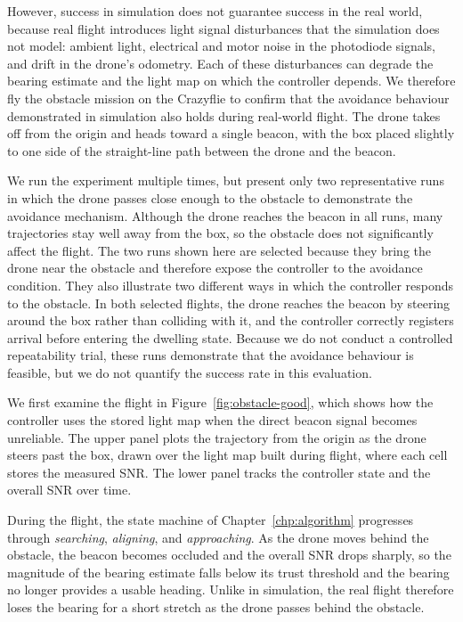 However, success in simulation does not guarantee success in the real world, because real flight introduces light signal disturbances that the simulation does not model: ambient light, electrical and motor noise in the photodiode signals, and drift in the drone's odometry. Each of these disturbances can degrade the bearing estimate and the light map on which the controller depends. We therefore fly the obstacle mission on the Crazyflie to confirm that the avoidance behaviour demonstrated in simulation also holds during real-world flight. The drone takes off from the origin and heads toward a single beacon, with the box placed slightly to one side of the straight-line path between the drone and the beacon.

We run the experiment multiple times, but present only two representative runs in which the drone passes close enough to the obstacle to demonstrate the avoidance mechanism. Although the drone reaches the beacon in all runs, many trajectories stay well away from the box, so the obstacle does not significantly affect the flight. The two runs shown here are selected because they bring the drone near the obstacle and therefore expose the controller to the avoidance condition. They also illustrate two different ways in which the controller responds to the obstacle. In both selected flights, the drone reaches the beacon by steering around the box rather than colliding with it, and the controller correctly registers arrival before entering the dwelling state. Because we do not conduct a controlled repeatability trial, these runs demonstrate that the avoidance behaviour is feasible, but we do not quantify the success rate in this evaluation.


We first examine the flight in Figure~\ref{fig:obstacle-good}, which shows how the controller uses the stored light map when the direct beacon signal becomes unreliable. The upper panel plots the trajectory from the origin as the drone steers past the box, drawn over the light map built during flight, where each cell stores the measured SNR. The lower panel tracks the controller state and the overall SNR over time.

During the flight, the state machine of Chapter~\ref{chp:algorithm} progresses through \emph{searching}, \emph{aligning}, and \emph{approaching}. As the drone moves behind the obstacle, the beacon becomes occluded and the overall SNR drops sharply, so the magnitude of the bearing estimate falls below its trust threshold and the bearing no longer provides a usable heading. Unlike in simulation, the real flight therefore loses the bearing for a short stretch as the drone passes behind the obstacle.

